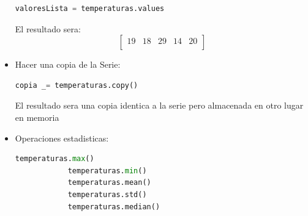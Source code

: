 \documentclass{article}
\begin{document}
\begin{itemize}
\begin{lstlisting}[language=Python, caption= Extraer todos los valores]
            valoresLista = temperaturas.values
        \end{lstlisting}
        El resultado sera:
        \[[
        \begin{array}{ccccc}
            19 & 18 & 29 & 14 & 20 \\
        \end{array}]
        \]
    \item Hacer una copia de la Serie:
        \begin{lstlisting}[language=Python, caption= Hacer copia de una serie]
            copia _= temperaturas.copy()
        \end{lstlisting}
        El resultado sera una copia identica a la serie pero almacenada en otro lugar en memoria
    \item Operaciones estadisticas:
        \begin{lstlisting}[language=Python, caption= Operaciones Estadisticas]
            temperaturas.max()
            temperaturas.min()
            temperaturas.mean() 
            temperaturas.std()
            temperaturas.median() 
        \end{lstlisting}
\end{itemize}
\end{document}
